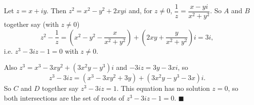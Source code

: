 Let $z=x+iy$. Then $z^2=x^2-y^2+2xyi$ and, for $z\ne0$, $\dfrac1z=\dfrac{x-yi}{x^2+y^2}$. So $A$ and $B$ together say (with $z\ne0$)
\[z^2-\dfrac1z=\left(x^2-y^2-\dfrac{x}{x^2+y^2}\right)+\left(2xy+\dfrac{y}{x^2+y^2}\right)i=3i,\]
i.e. $z^3-3iz-1=0$ with $z\ne0$.

Also $z^3=x^3-3xy^2+\left(3x^2y-y^3\right)i$ and $-3iz=3y-3xi$, so
\[z^3-3iz=\left(x^3-3xy^2+3y\right)+\left(3x^2y-y^3-3x\right)i.\]
So $C$ and $D$ together say $z^3-3iz=1$. This equation has no solution $z=0$, so both intersections are the set of roots of $z^3-3iz-1=0$. $\blacksquare$
